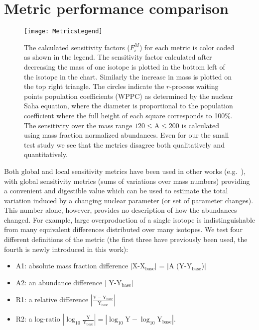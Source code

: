 \documentclass[aps,prc,reprint,showpacs,floatfix,nofootinbib]{revtex4-1}
\begin{document}
\section{Metric performance comparison}
\label{sec:metric-compare}
\begin{figure*}
\centering
\texttt{[image: MetricsLegend]}
\caption{The calculated sensitivity factors ($F^{M}_i$) for each metric is color coded as shown in
 the legend. The sensitivity factor calculated after decreasing the mass of one isotope is 
plotted in the bottom left of the isotope in the chart. Similarly the increase in mass is plotted on the top right triangle. 
The circles indicate the $r$-process waiting points population coefficients (WPPC) as determined by the nuclear Saha equation, 
where the diameter is proportional to the population coefficient where the full height of each square corresponds to 
100\%. 
The sensitivity over the mass range 
$120\le \textrm{A} \le 200$ is calculated using mass fraction normalized abundances. Even for our 
the small test study we see that the metrics disagree both qualitatively and quantitatively. \label{fig:metricCharts}}
\end{figure*}
%
Both global and local sensitivity metrics have been used in other works (e.g.~\citep{PhysRevC.92.035807,2012EPJA...48..184B,2012PhRvC..86c5803M}), with
global sensitivity metrics (sums of variations over mass numbers) providing a convenient and digestible value which can be used to 
estimate the total variation induced by a changing nuclear parameter (or set of parameter changes). This number alone, however, provides no 
description of how the abundances changed. For example, large overproduction of a single isotope is indistinguishable from many equivalent differences 
distributed over many isotopes. We test four different definitions of the metric (the first three have previously been used, the fourth is newly introduced in this work):
\begin{itemize}
\item A1: absolute mass fraction difference $|$X-X$_\textrm{base}|$ = $|$A (Y-Y$_\textrm{base}$)$|$
\item A2: an abundance difference $|$ Y-Y$_\textrm{base} |$
\item R1: a relative difference $|\frac{\mathrm{Y}-\mathrm{Y}_\mathrm{base}}{\mathrm{Y}_\mathrm{base}}|$
\item R2: a log-ratio $|\log_{10}\frac{\mathrm{Y}}{\mathrm{Y}_\mathrm{base}}| = | \log_{10}\mathrm{Y} - \log_{10}\mathrm{Y}_\mathrm{base}|$. 
\end{itemize}
\end{document}
